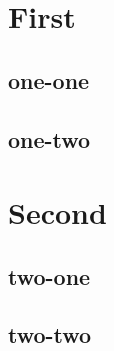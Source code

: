 \documentclass{doctor}
\begin{document}
\section{First}

\subsection{one-one}

\subsection{one-two}

\section{Second}

\subsection{two-one}

\subsection{two-two}
\end{document}
